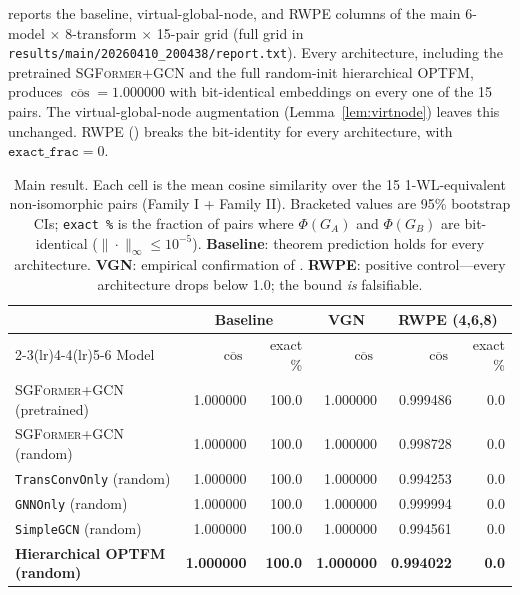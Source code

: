 \documentclass[11pt]{article}
\theoremstyle{plain}
\theoremstyle{definition}
\theoremstyle{remark}
\newcommand{\optfm}{\textsc{OPTFM}}
\newcommand{\sgformer}{\textsc{SGFormer}}
\newcommand{\rwpe}{\textsc{RWPE}}
\begin{document}
 reports the baseline, virtual-global-node, and
\rwpe{} columns of the main 6-model $\times$ 8-transform $\times$ 15-pair
grid (full grid in \texttt{results/main/20260410\_200438/report.txt}).
Every architecture, including the pretrained \sgformer{}+GCN and the full
random-init hierarchical \optfm{}, produces $\overline{\cos}\!=\!1.000000$
with bit-identical embeddings on every one of the 15 pairs. The
virtual-global-node augmentation (Lemma~\ref{lem:virtnode}) leaves this
unchanged. \rwpe{} () breaks the bit-identity for every
architecture, with $\texttt{exact\_frac}\!=\!0$.

\begin{table}[t]
\centering
\small
\caption{Main result. Each cell is the mean cosine similarity over the 15
1-WL-equivalent non-isomorphic pairs (Family I + Family II). Bracketed values
are 95\% bootstrap CIs; \texttt{exact \%} is the fraction of pairs where
$\Phi(G_A)$ and $\Phi(G_B)$ are bit-identical
($\|\cdot\|_\infty\!\le\!10^{-5}$). \textbf{Baseline}: theorem prediction holds
for every architecture. \textbf{VGN}: empirical confirmation of
. \textbf{\rwpe{}}: positive control---every architecture
drops below 1.0; the bound \emph{is} falsifiable.}
\label{tab:main}
\begin{tabular}{@{}lrrrrr@{}}
\toprule
& \multicolumn{2}{c}{Baseline} & \multicolumn{1}{c}{VGN} & \multicolumn{2}{c}{\rwpe{} (4,6,8)} \\
\cmidrule(lr){2-3}\cmidrule(lr){4-4}\cmidrule(lr){5-6}
Model & $\overline{\cos}$ & exact \% & $\overline{\cos}$ & $\overline{\cos}$ & exact \% \\
\midrule
\sgformer{}+GCN (pretrained)        & 1.000000 & 100.0 & 1.000000 & 0.999486 & 0.0 \\
\sgformer{}+GCN (random)            & 1.000000 & 100.0 & 1.000000 & 0.998728 & 0.0 \\
\texttt{TransConvOnly} (random)     & 1.000000 & 100.0 & 1.000000 & 0.994253 & 0.0 \\
\texttt{GNNOnly} (random)           & 1.000000 & 100.0 & 1.000000 & 0.999994 & 0.0 \\
\texttt{SimpleGCN} (random)         & 1.000000 & 100.0 & 1.000000 & 0.994561 & 0.0 \\
\textbf{Hierarchical \optfm{} (random)} & \textbf{1.000000} & \textbf{100.0} & \textbf{1.000000} & \textbf{0.994022} & \textbf{0.0} \\
\bottomrule
\end{tabular}
\end{table}
\end{document}
